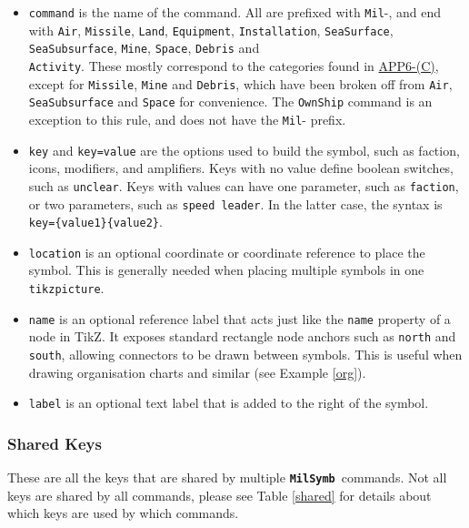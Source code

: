 \documentclass[a4paper, titlepage]{article}
\newcommand\MilSymb{\textbf{\texttt{MilSymb}}}
\newcommand\DocLink{\href{https://www.awl.edu.pl/images/en/APP_6_C.pdf}{APP6-(C)}}
\begin{document}
\begin{itemize}
\item \texttt{command} is the name of the command. All are prefixed with \texttt{Mil}-, and end with \texttt{Air}, \texttt{Missile}, \texttt{Land}, \texttt{Equipment}, \texttt{Installation}, \texttt{SeaSurface}, \texttt{SeaSubsurface}, \texttt{Mine}, \texttt{Space}, \texttt{Debris} and\\ \texttt{Activity}. These mostly correspond to the categories found in \DocLink, except for \texttt{Missile}, \texttt{Mine} and \texttt{Debris}, which have been broken off from \texttt{Air}, \texttt{SeaSubsurface} and \texttt{Space} for convenience. The \texttt{OwnShip} command is an exception to this rule, and does not have the \texttt{Mil}- prefix.

\item \texttt{key} and \texttt{key=value} are the options used to build the symbol, such as faction, icons, modifiers, and amplifiers. Keys with no value define boolean switches, such as \texttt{unclear}. Keys with values can have one parameter, such as \texttt{faction}, or two parameters, such as \texttt{speed leader}. In the latter case, the syntax is \texttt{key=\{value1\}\{value2\}}.
\item \texttt{location} is an optional coordinate or coordinate reference to place the symbol. This is generally needed when placing multiple symbols in one \texttt{tikzpicture}.
\item \texttt{name} is an optional reference label that acts just like the \texttt{name} property of a node in TikZ. It exposes standard rectangle node anchors such as \texttt{north} and \texttt{south}, allowing connectors to be drawn between symbols. This is useful when drawing organisation charts and similar (see Example \ref{org}).
\item \texttt{label} is an optional text label that is added to the right of the symbol.
\end{itemize}

\subsubsection{Shared Keys}

These are all the keys that are shared by multiple \MilSymb\ commands. Not all keys are shared by all commands, please see Table \ref{shared} for details about which keys are used by which commands.
\end{document}
